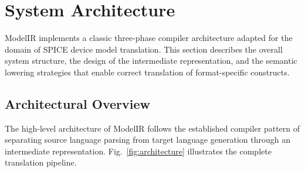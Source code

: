 \documentclass[conference]{IEEEtran}
\begin{document}
\section{System Architecture}

ModelIR implements a classic three-phase compiler architecture adapted for the domain of SPICE device model translation. This section describes the overall system structure, the design of the intermediate representation, and the semantic lowering strategies that enable correct translation of format-specific constructs.

\subsection{Architectural Overview}

The high-level architecture of ModelIR follows the established compiler pattern of separating source language parsing from target language generation through an intermediate representation. Fig.~\ref{fig:architecture} illustrates the complete translation pipeline.
\end{document}
